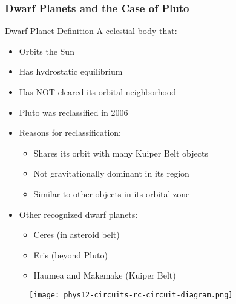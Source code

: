 \documentclass{beamer}
\begin{document}
\begin{frame}
\frametitle{Dwarf Planets and the Case of Pluto}

\begin{block}{Dwarf Planet Definition}
A celestial body that:
\begin{itemize}
    \item Orbits the Sun
    \item Has hydrostatic equilibrium
    \item Has NOT cleared its orbital neighborhood
\end{itemize}
\end{block}

\begin{itemize}
    \item Pluto was reclassified in 2006
    \item Reasons for reclassification:
    \begin{itemize}
        \item Shares its orbit with many Kuiper Belt objects
        \item Not gravitationally dominant in its region
        \item Similar to other objects in its orbital zone
    \end{itemize}
    \item Other recognized dwarf planets:
    \begin{itemize}
        \item Ceres (in asteroid belt)
        \item Eris (beyond Pluto)
        \item Haumea and Makemake (Kuiper Belt)
    \end{itemize}
\end{itemize}

\end{frame}
\begin{frame}
\begin{figure}
    \centering
    \texttt{[image: phys12-circuits-rc-circuit-diagram.png]}
\end{figure}
\end{frame}
\end{document}
